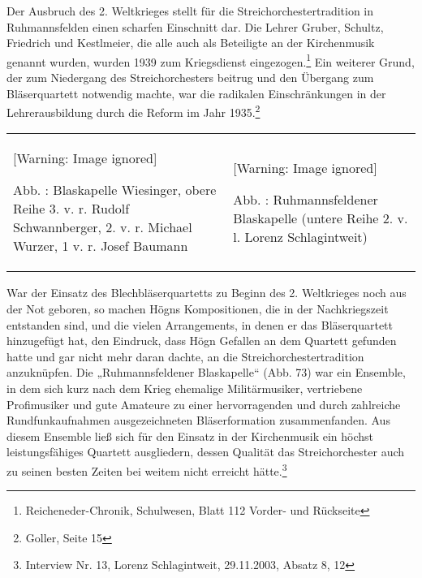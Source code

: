 \documentclass[a4paper]{article}
\newcounter{Abb}
\renewcommand\theAbb{\arabic{Abb}}
\begin{document}
Der Ausbruch des 2. Weltkrieges stellt für die Streichorchestertradition
in Ruhmannsfelden einen scharfen Einschnitt dar. Die Lehrer Gruber,
Schultz, Friedrich und Kestlmeier, die alle auch als Beteiligte an der
Kirchenmusik genannt wurden, wurden 1939 zum Kriegsdienst
eingezogen.\footnote{ Reicheneder-Chronik, Schulwesen, Blatt 112
Vorder- und Rückseite} Ein weiterer Grund, der zum Niedergang des
Streichorchesters beitrug und den Übergang zum Bläserquartett notwendig
machte, war die radikalen Einschränkungen in der Lehrerausbildung durch
die Reform im Jahr 1935.\footnote{ Goller, Seite 15}

\begin{flushleft}
\tablefirsthead{}
\tablehead{}
\tabletail{}
\tablelasttail{}
\begin{supertabular}{m{7.573cm}m{8.08cm}}
  [Warning: Image ignored] %
 
\label{bkm:Ref100229810}Abb. \stepcounter{Abb}{\theAbb}: Blaskapelle
Wiesinger, obere Reihe 3. v. r. Rudolf Schwannberger, 2. v. r. Michael
Wurzer, 1 v. r. Josef Baumann &
  [Warning: Image ignored] %
 
\label{bkm:Ref100229831}Abb. \stepcounter{Abb}{\theAbb}:
Ruhmannsfeldener Blaskapelle (untere Reihe 2. v. l. Lorenz
Schlagintweit)\\
\end{supertabular}
\end{flushleft}
War der Einsatz des Blechbläserquartetts zu Beginn des 2. Weltkrieges
noch aus der Not geboren, so machen Högns Kompositionen, die in der
Nachkriegszeit entstanden sind, und die vielen Arrangements, in denen
er das Bläserquartett hinzugefügt hat, den Eindruck, dass Högn Gefallen
an dem Quartett gefunden hatte und gar nicht mehr daran dachte, an die
Streichorchestertradition anzuknüpfen. Die „Ruhmannsfeldener
Blaskapelle“ (Abb. 73) war ein Ensemble, in dem sich kurz nach dem
Krieg ehemalige Militärmusiker, vertriebene Profimusiker und gute
Amateure zu einer hervorragenden und durch zahlreiche Rundfunkaufnahmen
ausgezeichneten Bläserformation zusammenfanden. Aus diesem Ensemble
ließ sich für den Einsatz in der Kirchenmusik ein höchst
leistungsfähiges Quartett ausgliedern, dessen Qualität das
Streichorchester auch zu seinen besten Zeiten bei weitem nicht erreicht
hätte.\footnote{ Interview Nr. 13, Lorenz Schlagintweit, 29.11.2003,
Absatz 8, 12} 
\end{document}
